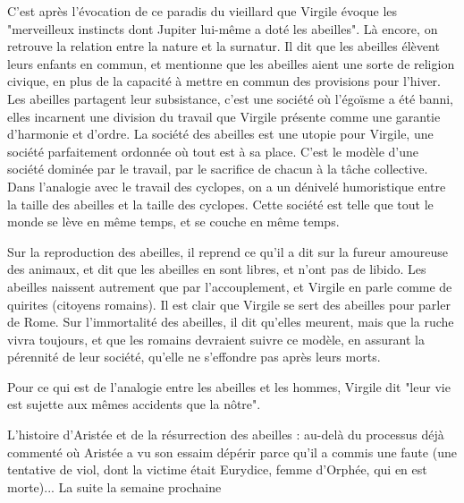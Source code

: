 \documentclass[a4paper,12pt]{book}
\begin{document}
\par C'est après l'évocation de ce paradis du vieillard que Virgile évoque les "merveilleux instincts dont Jupiter lui-même a doté les abeilles". Là encore, on retrouve la relation entre la nature et la surnatur. Il dit que les abeilles élèvent leurs enfants en commun, et mentionne que les abeilles aient une sorte de religion civique, en plus de la capacité à mettre en commun des provisions pour l'hiver. Les abeilles partagent leur subsistance, c'est une société où l'égoïsme a été banni, elles incarnent une division du travail que Virgile présente comme une garantie d'harmonie et d'ordre. La société des abeilles est une utopie pour Virgile, une société parfaitement ordonnée où tout est à sa place. C'est le modèle d'une société dominée par le travail, par le sacrifice de chacun à la tâche collective. Dans l'analogie avec le travail des cyclopes, on a un dénivelé humoristique entre la taille des abeilles et la taille des cyclopes. Cette société est telle que tout le monde se lève en même temps, et se couche en même temps.
\par Sur la reproduction des abeilles, il reprend ce qu'il a dit sur la fureur amoureuse des animaux, et dit que les abeilles en sont libres, et n'ont pas de libido. Les abeilles naissent autrement que par l'accouplement, et Virgile en parle comme de quirites (citoyens romains). Il est clair que Virgile se sert des abeilles pour parler de Rome. Sur l'immortalité des abeilles, il dit qu'elles meurent, mais que la ruche vivra toujours, et que les romains devraient suivre ce modèle, en assurant la pérennité de leur société, qu'elle ne s'effondre pas après leurs morts.
\par Pour ce qui est de l'analogie entre les abeilles et les hommes, Virgile dit "leur vie est sujette aux mêmes accidents que la nôtre".
\par L'histoire d'Aristée et de la résurrection des abeilles : au-delà du processus déjà commenté où Aristée a vu son essaim dépérir parce qu'il a commis une faute (une tentative de viol, dont la victime était Eurydice, femme d'Orphée, qui en est morte)... La suite la semaine prochaine
\end{document}
